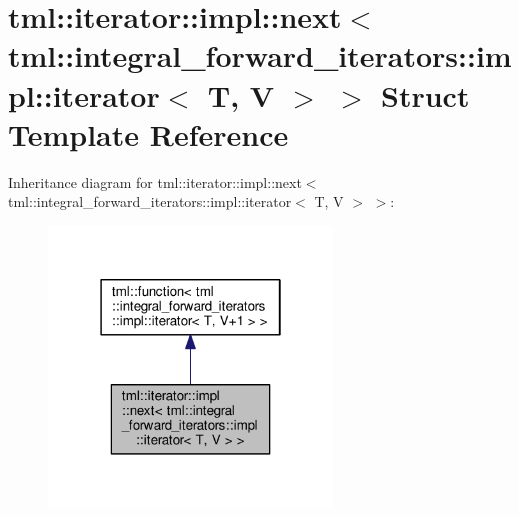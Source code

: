 \hypertarget{structtml_1_1iterator_1_1impl_1_1next_3_01tml_1_1integral__forward__iterators_1_1impl_1_1iterator_3_01_t_00_01_v_01_4_01_4}{\section{tml\+:\+:iterator\+:\+:impl\+:\+:next$<$ tml\+:\+:integral\+\_\+forward\+\_\+iterators\+:\+:impl\+:\+:iterator$<$ T, V $>$ $>$ Struct Template Reference}
\label{structtml_1_1iterator_1_1impl_1_1next_3_01tml_1_1integral__forward__iterators_1_1impl_1_1iterator_3_01_t_00_01_v_01_4_01_4}
}


Inheritance diagram for tml\+:\+:iterator\+:\+:impl\+:\+:next$<$ tml\+:\+:integral\+\_\+forward\+\_\+iterators\+:\+:impl\+:\+:iterator$<$ T, V $>$ $>$\+:
\nopagebreak
\begin{figure}[H]
\begin{center}
\leavevmode
\includegraphics[width=214pt]{structtml_1_1iterator_1_1impl_1_1next_3_01tml_1_1integral__forward__iterators_1_1impl_1_1iteratod241e3f7f8ada524314fd14bfbb06daf}
\end{center}
\end{figure}


